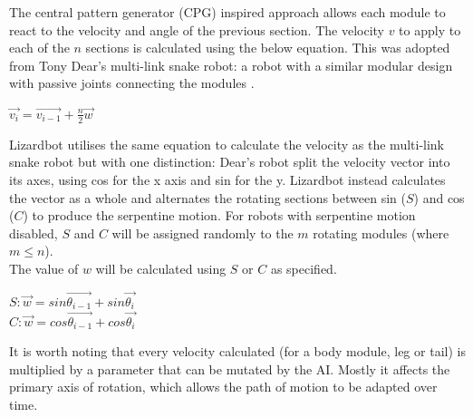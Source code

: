 \documentclass{article}
\begin{document}
The central pattern generator (CPG) inspired approach allows each module to react to the velocity and angle of the previous section.
The velocity $v$ to apply to each of the $n$ sections is calculated using the below equation. This was adopted from Tony Dear’s multi-link snake robot: a robot with a similar modular design with passive joints connecting the modules .
\begin{center}
\begin{Large}
$\overrightarrow{v_{i}} = \overrightarrow{v_{i-1}} + \frac{n}{2}\overrightarrow{w} $
\end{Large}
\end{center}

\noindent Lizardbot utilises the same equation to calculate the velocity as the multi-link snake robot but with one distinction: Dear’s robot split the velocity vector into its axes, using cos for the x axis and sin for the y. Lizardbot instead calculates the vector as a whole and alternates the rotating sections between sin ($S$) and cos ($C$) to produce the serpentine motion. For robots with serpentine motion disabled, $S$ and $C$ will be assigned randomly to the $m$ rotating modules (where $m \leq n$).\\

\noindent The value of $w$ will be calculated using $S$ or $C$ as specified.\\
\begin{center}
\begin{Large}
$S: \overrightarrow{w} = sin\overrightarrow{\theta_{i-1}} + sin\overrightarrow{\theta_{i}}$
\\[1\baselineskip]
$C: \overrightarrow{w} = cos\overrightarrow{\theta_{i-1}} + cos\overrightarrow{\theta_{i}}$\\
\end{Large}
\end{center}

It is worth noting that every velocity calculated (for a body module, leg or tail) is multiplied by a parameter that can be mutated by the AI. Mostly it affects the primary axis of rotation, which allows the path of motion to be adapted over time.
\end{document}
